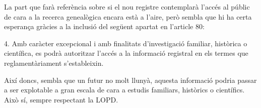     La part que farà referència sobre si el nou registre contemplarà l'accés al públic de cara a la recerca genealògica encara està a l'aire, però sembla que hi ha certa esperança gràcies a la inclusió del següent apartat en l'article 80:

    \begin{displayquote}
        4. Amb caràcter excepcional i amb finalitats d'investigació familiar, històrica o científica, es podrà autoritzar l'accés a la informació registral en els termes que reglamentàriament s'estableixin.
    \end{displayquote}

    Així doncs, sembla que un futur no molt llunyà, aquesta informació podria passar a ser explotable a gran escala de cara a estudis familiars, històrics o científics. Això sí, sempre respectant la \gls{LOPD}.
